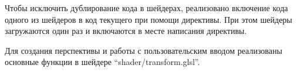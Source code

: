 
Чтобы исключить дублирование кода в шейдерах, реализовано включение
кода одного из шейдеров в код текущего при помощи директивы. При этом
шейдеры загружаются один раз и включаются в месте написания директивы.


 

Для создания перспективы и работы с пользовательским вводом
реализованы основные функции в шейдере ``shader/transform.glsl''.


